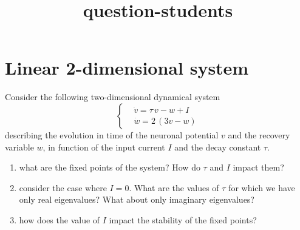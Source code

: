 \documentclass[a4paper, 10pt]{article}
\title{question-students}
\author{}
\begin{document}

  \section{Linear 2-dimensional system}
  Consider the following two-dimensional dynamical system
  \begin{equation}
    \left\{\begin{aligned}
      &\dot{v} = \tau \, v - w + I\\
      &\dot{w} = 2 \, (3 v - w) 
    \end{aligned}\right.
  \end{equation}
  describing the evolution in time of the neuronal potential $v$ and the
  recovery variable $w$, in function of the input current $I$ and the decay
  constant $\tau$.
  \begin{enumerate}
    \item what are the fixed points of the system? How do $\tau$ and $I$ impact
      them?
    \item consider the case where $I = 0$. What are the values of $\tau$ for
      which we have only real eigenvalues? What about only imaginary
      eigenvalues?
    \item how does the value of $I$ impact the stability of the fixed points?
  \end{enumerate}
  
  \newpage
\end{document}
